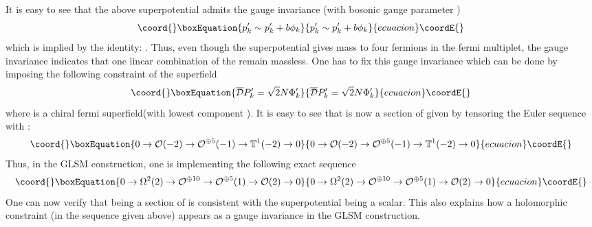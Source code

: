 \documentclass[a4paper,12pt]{article}
\def\Bbb{\mathbb}
\def\BT{\Bbb T}
\begin{document}
It is easy to see that
the above superpotential admits the gauge invariance (with bosonic
gauge parameter \coordHE{})
\begin{equation}\coord{}\boxEquation{
p'_k \sim p'_k + b \phi_k 
}{
p'_k \sim p'_k + b \phi_k 
}{ecuacion}\coordE{}\end{equation}
which is implied by the identity:  \coordHE{}.  
Thus, even though the superpotential gives mass to four fermions
in the fermi multiplet, the gauge invariance indicates that
one linear combination of the \coordHE{} remain massless. 
One has to fix this gauge invariance which can be done by
imposing the following constraint of the superfield \coordHE{}
\begin{equation}\coord{}\boxEquation{
\overline{\cal D} P'_k = \sqrt2  N \Phi'_k
}{
\overline{\cal D} P'_k = \sqrt2  N \Phi'_k
}{ecuacion}\coordE{}\end{equation}
where \coordHE{} is a chiral fermi superfield(with lowest component \coordHE{}). 
It is easy to see that \coordHE{} is now
a section of \myHighlight{$\BT^1(-2)=(\Omega^1(2))^*$}\coordHE{} given by tensoring the Euler
sequence with \coordHE{}:
\begin{equation}\coord{}\boxEquation{
0\rightarrow {\cal O}(-2)
\rightarrow {\cal O}^{\oplus 5}(-1)\rightarrow
\BT^1(-2)\rightarrow 0
}{
0\rightarrow {\cal O}(-2)
\rightarrow {\cal O}^{\oplus 5}(-1)\rightarrow
\BT^1(-2)\rightarrow 0
}{ecuacion}\coordE{}\end{equation}
Thus, in the GLSM construction, one is  implementing
the following exact sequence
\begin{equation}\coord{}\boxEquation{
0\rightarrow \Omega^{2}(2)
\rightarrow {\cal O}^{\oplus 10}\rightarrow
{\cal O}^{\oplus 5}(1)\rightarrow
{\cal O}(2)\rightarrow 0 
}{
0\rightarrow \Omega^{2}(2)
\rightarrow {\cal O}^{\oplus 10}\rightarrow
{\cal O}^{\oplus 5}(1)\rightarrow
{\cal O}(2)\rightarrow 0 
}{ecuacion}\coordE{}\end{equation}
One can now verify that \coordHE{} being a section of \myHighlight{$\BT^1(-2)$}\coordHE{} is
consistent with the superpotential \coordHE{} being a scalar. 
This also explains
how a holomorphic constraint (in the sequence given above) appears
as a gauge invariance in the GLSM construction.
\end{document}
